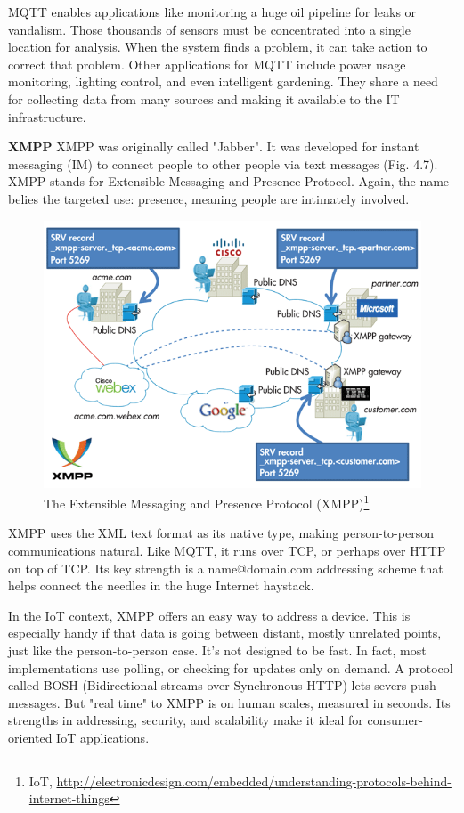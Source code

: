       MQTT enables applications like monitoring a huge oil pipeline for leaks or vandalism. Those thousands of sensors must be concentrated into a single location for analysis. When the system finds a problem, it can take action to correct that problem. Other applications for MQTT include power usage monitoring, lighting control, and even intelligent gardening. They share a need for collecting data from many sources and making it available to the IT infrastructure.

     \textbf{XMPP}
      \newline 
      XMPP was originally called "Jabber". It was developed for instant messaging (IM) to connect people to other people via text messages (Fig. 4.7). XMPP stands for Extensible Messaging and Presence Protocol. Again, the name belies the targeted use: presence, meaning people are intimately involved.
      \begin{figure}[!ht]
      \centering
      \includegraphics[scale=0.7]{images/XMPP.png}   
      \caption[The Extensible Messaging and Presence Protocol (XMPP)]{The Extensible Messaging and Presence Protocol (XMPP)\footnote{IoT, \url{http://electronicdesign.com/embedded/understanding-protocols-behind-internet-things}}}
      \label{img:XMPP}                           
      \end{figure}
      XMPP uses the XML text format as its native type, making person-to-person communications natural. Like MQTT, it runs over TCP, or perhaps over HTTP on top of TCP. Its key strength is a name@domain.com addressing scheme that helps connect the needles in the huge Internet haystack.

      In the IoT context, XMPP offers an easy way to address a device. This is especially handy if that data is going between distant, mostly unrelated points, just like the person-to-person case. It’s not designed to be fast. In fact, most implementations use polling, or checking for updates only on demand. A protocol called BOSH (Bidirectional streams over Synchronous HTTP) lets severs push messages. But "real time" to XMPP is on human scales, measured in seconds. Its strengths in addressing, security, and scalability make it ideal for consumer-oriented IoT applications.

